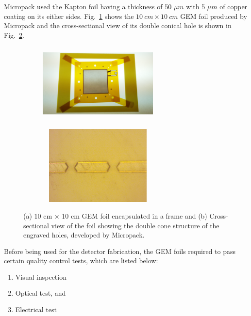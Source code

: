 Micropack used the Kapton foil having a thickness of 50 $\mu m$ with 5 $\mu m$ of copper coating on its either sides. Fig.~\ref{fig:Foil_and_Cone_a} shows the $10~cm\times10~cm$ GEM foil produced by Micropack and the cross-sectional view of its double conical hole is shown in Fig.~\ref{fig:Foil_and_Cone_b}.
\begin{figure}[!htbp]
    \centering
    \begin{subfigure}[b]{0.46\textwidth}
        \includegraphics[width=6cm, height=4cm]{figures/GEM/figures/Foil_01.png}\qquad
        \caption{ }
        \label{fig:Foil_and_Cone_a}
    \end{subfigure}
    \begin{subfigure}[b]{0.46\textwidth}
        \includegraphics[width=6cm, height=4cm]{figures/GEM/figures/double_cone.png}
        \caption{ }
        \label{fig:Foil_and_Cone_b}
    \end{subfigure}
   \caption{(a) 10 cm $\times$ 10 cm GEM foil encapsulated in a frame and (b) Cross-sectional view of the foil showing the double cone structure of the engraved holes, developed by Micropack.} \label{fig:Foil_and_Cone}
\end{figure}

Before being used for the detector fabrication, the GEM foils required to pass certain quality control tests, which are listed below:
\begin{enumerate}
    \item Visual inspection
    \item Optical test, and 
    \item Electrical test
\end{enumerate}

